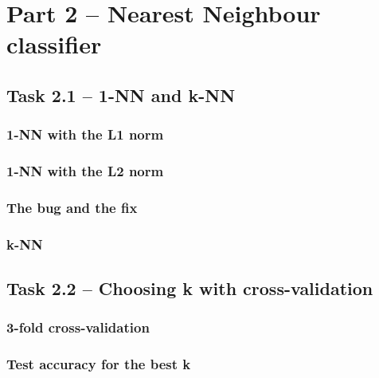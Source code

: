 \section{Part 2 -- Nearest Neighbour classifier}

\subsection{Task 2.1 -- 1-NN and k-NN}

\subsubsection*{1-NN with the L1 norm}

\subsubsection*{1-NN with the L2 norm}

\subsubsection*{The bug and the fix}

\subsubsection*{k-NN}

\subsection{Task 2.2 -- Choosing k with cross-validation}

\subsubsection*{3-fold cross-validation}

\subsubsection*{Test accuracy for the best k}
